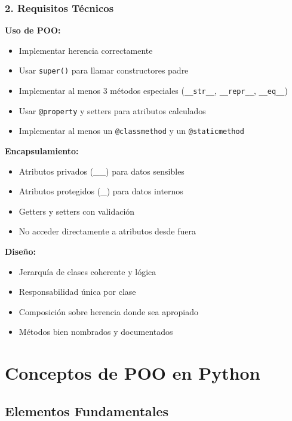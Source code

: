 \documentclass[11pt,letterpaper]{article}
\begin{document}
\subsubsection{2. Requisitos Técnicos}

\textbf{Uso de POO:}
\begin{itemize}
    \item Implementar herencia correctamente
    \item Usar \texttt{super()} para llamar constructores padre
    \item Implementar al menos 3 métodos especiales (\texttt{\_\_str\_\_}, \texttt{\_\_repr\_\_}, \texttt{\_\_eq\_\_})
    \item Usar \texttt{@property} y setters para atributos calculados
    \item Implementar al menos un \texttt{@classmethod} y un \texttt{@staticmethod}
\end{itemize}

\textbf{Encapsulamiento:}
\begin{itemize}
    \item Atributos privados (\_\_) para datos sensibles
    \item Atributos protegidos (\_) para datos internos
    \item Getters y setters con validación
    \item No acceder directamente a atributos desde fuera
\end{itemize}

\textbf{Diseño:}
\begin{itemize}
    \item Jerarquía de clases coherente y lógica
    \item Responsabilidad única por clase
    \item Composición sobre herencia donde sea apropiado
    \item Métodos bien nombrados y documentados
\end{itemize}

\section{Conceptos de POO en Python}

\subsection{Elementos Fundamentales}
\end{document}
